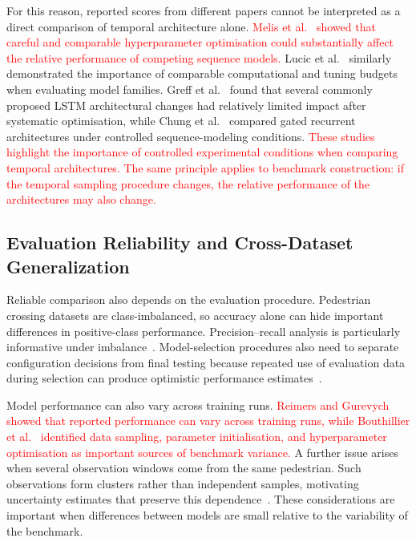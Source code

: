 \documentclass[mti,article,submit,moreauthors]{Definitions/mdpi}
\begin{document}
For this reason, reported scores from different papers cannot be interpreted as a direct comparison of temporal architecture alone. \textcolor{red}{Melis et al.~\citep{melis2018sota} showed that careful and comparable hyperparameter optimisation could substantially affect the relative performance of competing sequence models.} Lucic et al.~\citep{lucic2018gans} similarly demonstrated the importance of comparable computational and tuning budgets when evaluating model families. Greff et al.~\citep{greff2017odyssey} found that several commonly proposed LSTM architectural changes had relatively limited impact after systematic optimisation, while Chung et al.~\citep{chung2014gru} compared gated recurrent architectures under controlled sequence-modeling conditions. \textcolor{red}{These studies highlight the importance of controlled experimental conditions when comparing temporal architectures. The same principle applies to benchmark construction: if the temporal sampling procedure changes, the relative performance of the architectures may also change.}

\subsection{Evaluation Reliability and Cross-Dataset Generalization}

Reliable comparison also depends on the evaluation procedure. Pedestrian crossing datasets are class-imbalanced, so accuracy alone can hide important differences in positive-class performance. Precision--recall analysis is particularly informative under imbalance~\citep{davis2006precision,saito2015precision}. Model-selection procedures also need to separate configuration decisions from final testing because repeated use of evaluation data during selection can produce optimistic performance estimates~\citep{cawley2010overfitting}.

Model performance can also vary across training runs. \textcolor{red}{Reimers and Gurevych~\citep{reimers2017reporting} showed that reported performance can vary across training runs, while Bouthillier et al.~\citep{bouthillier2021variance} identified data sampling, parameter initialisation, and hyperparameter optimisation as important sources of benchmark variance.} A further issue arises when several observation windows come from the same pedestrian. Such observations form clusters rather than independent samples, motivating uncertainty estimates that preserve this dependence~\citep{fieldwelsh2007}. These considerations are important when differences between models are small relative to the variability of the benchmark.
\end{document}

